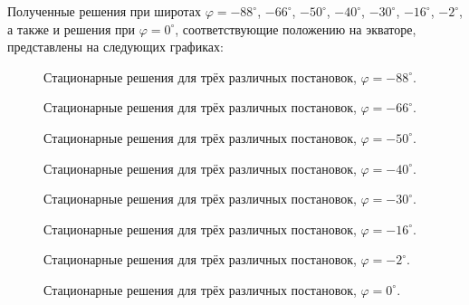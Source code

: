 \documentclass[14pt, a4paper, fleqn]{extarticle}
\begin{document}
Полученные решения при широтах $\varphi = -88^\circ$, $-66^\circ$, $-50^\circ$, $-40^\circ$, $-30^\circ$, $-16^\circ$, $-2^\circ$, а также и решения при $\varphi = 0^\circ$, соответствующие положению на экваторе, представлены на следующих графиках:

\begin{figure}[H]
\caption{Стационарные решения для трёх различных постановок, $\varphi = -88^\circ$.}
\end{figure}

\begin{figure}[H]
\caption{Стационарные решения для трёх различных постановок, $\varphi = -66^\circ$.}
\end{figure}

\begin{figure}[H]
\caption{Стационарные решения для трёх различных постановок, $\varphi = -50^\circ$.}
\end{figure}

\begin{figure}[H]
\caption{Стационарные решения для трёх различных постановок, $\varphi = -40^\circ$.}
\end{figure}

\begin{figure}[H]
\caption{Стационарные решения для трёх различных постановок, $\varphi = -30^\circ$.}
\end{figure}


\begin{figure}[H]
\caption{Стационарные решения для трёх различных постановок, $\varphi = -16^\circ$.}
\end{figure}


\begin{figure}[H]
\caption{Стационарные решения для трёх различных постановок, $\varphi = -2^\circ$.}
\end{figure}

\begin{figure}[H]
\caption{Стационарные решения для трёх различных постановок, $\varphi = 0^\circ$.}
\end{figure}
\end{document}
